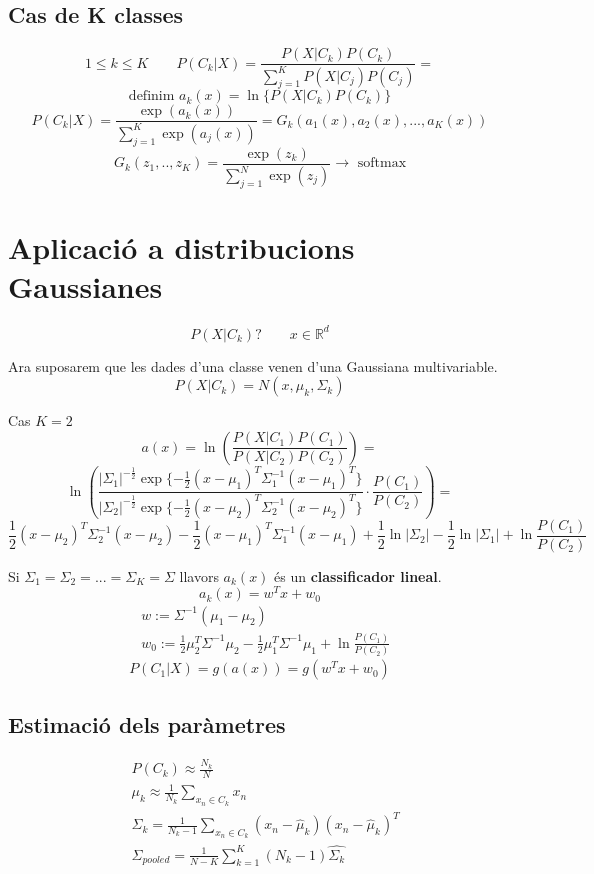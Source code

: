 \documentclass[a4paper]{article}
\begin{document}
\subsection{Cas de K classes}
$$
1 \le k \le K \qquad P(C_k | X) = \frac{P(X|C_k)P(C_k)}{\sum_{j=1}^K P(X|C_j)P(C_j)} =
$$
$$
\text{definim } a_k(x) = \ln\{P(X|C_k)P(C_k)\}
$$
$$
P(C_k|X) = \frac{\exp(a_k(x))}{\sum_{j=1}^K \exp(a_j(x))} = G_k (a_1(x), a_2(x),...,a_K(x))
$$
$$
G_k(z_1,..,z_K) = \frac{\exp(z_k)}{\sum_{j=1}^N \exp(z_j)} \longrightarrow \text{ softmax}
$$

\section{Aplicació a distribucions Gaussianes}
$$
P(X|C_k) ? \qquad x \in \mathbb{R}^d
$$

Ara suposarem que les dades d'una classe venen d'una Gaussiana multivariable.
$$
P(X|C_k) = N(x, \mu_k, \Sigma_k)
$$

Cas $K=2$
$$
a(x) = \ln \left( \frac{P(X|C_1)P(C_1)}{P(X|C_2)P(C_2)} \right) =
$$
$$
\ln \left( \frac{|\Sigma_1|^{-\frac{1}{2}} 
	\exp\{ -\frac{1}{2}(x - \mu_1)^T \Sigma_1^{-1}(x - \mu_1)^T \} }
	{|\Sigma_2|^{-\frac{1}{2}} 
	\exp\{ -\frac{1}{2}(x - \mu_2)^T \Sigma_2^{-1}(x - \mu_2)^T \}} ·
\frac{P(C_1)}{P(C_2)}\right) =
$$
$$
\frac{1}{2}(x - \mu_2)^T \Sigma_2^{-1} (x - \mu_2) - \frac{1}{2}(x - \mu_1)^T 
\Sigma_1^{-1}(x - \mu_1) + \frac{1}{2}\ln|\Sigma_2| - \frac{1}{2}\ln|\Sigma_1| + 
\ln \frac{P(C_1)}{P(C_2)}
$$

Si $\Sigma_1 = \Sigma_2 = ... = \Sigma_K = \Sigma$ llavors $a_k(x)$ és un \textbf{classificador lineal}.
$$
a_k(x) = w^T x + w_0
$$
\begin{align*}
	& w := \Sigma^{-1}(\mu_1 - \mu_2) \\
	& w_0 := \frac{1}{2} \mu_2^T \Sigma^{-1}\mu_2 - \frac{1}{2}\mu_1^T \Sigma^{-1}\mu_1
	+ \ln \frac{P(C_1)}{P(C_2)}
\end{align*}
$$
P(C_1|X) = g(a(x)) = g(w^Tx + w_0)
$$

\subsection{Estimació dels paràmetres}

\begin{align*}
&	P(C_k) \approx \frac{N_k}{N} \\
&	\mu_k \approx \frac{1}{N_k} \sum_{x_n \in C_k} x_n \\
&	\Sigma_k = \frac{1}{N_k - 1} \sum_{x_n \in C_k} (x_n - \hat{\mu}_k)(x_n - \hat{\mu}_k)^T \\
&	\Sigma_{pooled} = \frac{1}{N - K} \sum_{k=1}^K (N_k - 1) \hat{\Sigma_k}
\end{align*}
\end{document}
